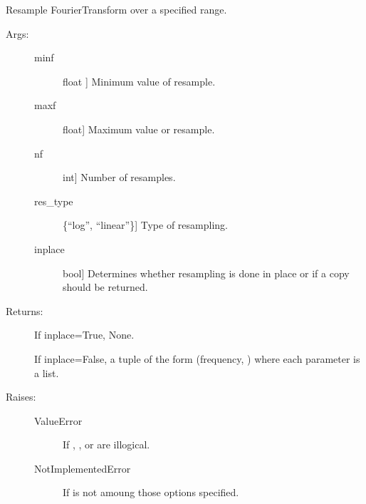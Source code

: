 \documentclass[letterpaper,10pt,english]{sphinxmanual}
\begin{document}
\begin{fulllineitems}
\begin{fulllineitems}
\end{fulllineitems}



\begin{fulllineitems}
Resample FourierTransform over a specified range.
\begin{description}
\item[{Args:}] \leavevmode\begin{description}
\item[{minf}] \leavevmode{[}float {]}
Minimum value of resample.

\item[{maxf}] \leavevmode{[}float{]}
Maximum value or resample.

\item[{nf}] \leavevmode{[}int{]}
Number of resamples.

\item[{res\_type}] \leavevmode{[}\{“log”, “linear”\}{]}
Type of resampling.

\item[{inplace}] \leavevmode{[}bool{]}
Determines whether resampling is done in place or 
if a copy should be returned.

\end{description}

\item[{Returns:}] \leavevmode
If inplace=True, None.

If inplace=False, a tuple of the form (frequency, ) where each parameter is a list.

\item[{Raises:}] \leavevmode\begin{description}
\item[{ValueError}] \leavevmode
If , , or  are illogical.

\item[{NotImplementedError}] \leavevmode
If  is not amoung those options specified.

\end{description}

\end{description}

\end{fulllineitems}


\end{fulllineitems}
\end{document}
